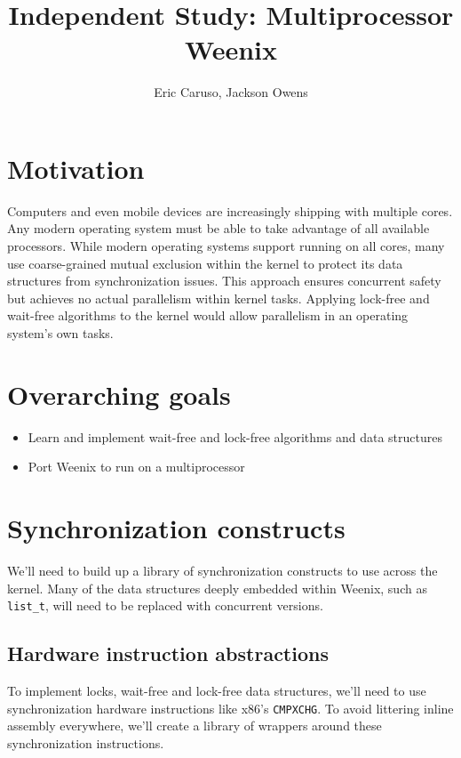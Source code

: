 \documentclass{article}
\begin{document}
\title{Independent Study: Multiprocessor Weenix}
\author{Eric Caruso, Jackson Owens}
\maketitle

\section{Motivation}

Computers and even mobile devices are increasingly shipping with multiple cores. Any modern
operating system must be able to take advantage of all available processors. While modern
operating systems support running on all cores, many use coarse-grained mutual exclusion 
within the kernel to protect its data structures from synchronization issues. This approach
ensures concurrent safety but achieves no actual parallelism within kernel tasks. Applying 
lock-free and wait-free algorithms to the kernel would allow parallelism in an operating 
system's own tasks.

\section{Overarching goals}

\begin{itemize}
    \item Learn and implement wait-free and lock-free algorithms and data structures
    \item Port Weenix to run on a multiprocessor
\end{itemize}

\section{Synchronization constructs}

We'll need to build up a library of synchronization constructs to use across the kernel. Many of
the data structures deeply embedded within Weenix, such as {\tt{list\_t}}, will need to be
replaced with concurrent versions.

\subsection{Hardware instruction abstractions}

To implement locks, wait-free and lock-free data structures, we'll need to use synchronization 
hardware instructions like x86's {\tt{CMPXCHG}}. To avoid littering inline assembly everywhere,
we'll create a library of wrappers around these synchronization instructions.
\end{document}
